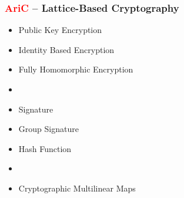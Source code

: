 \documentclass[c]{beamer}
\begin{document}
\begin{frame}
\frametitle{\textcolor{red}{AriC} -- Lattice-Based Cryptography}

\begin{itemize}
\item Public Key Encryption
\item Identity Based Encryption
\item Fully Homomorphic Encryption
\item[]
\item Signature
\item Group Signature
\item Hash Function
\item[]
\item Cryptographic Multilinear Maps
\end{itemize}
\end{frame}


%
%
\end{document}
